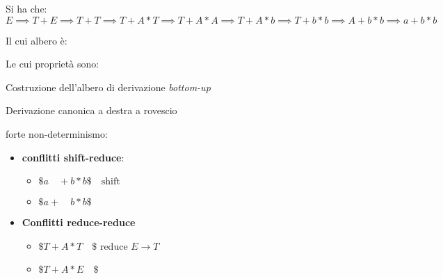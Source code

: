 {    Si ha che:
    \[
        E\implies T+E\implies T+T \implies T + A* T \implies T+A*A \implies T + A * b \implies T + b * b \implies A + b*b  \implies a + b*b
    \]

    Il cui albero è:
    \begin{center}
    \end{center}
    
    Le cui proprietà sono:
    \begin{center}
        \item Costruzione dell'albero di derivazione \textit{bottom-up}    
        \item Derivazione canonica a destra a rovescio
        \item forte non-determinismo:
        \begin{itemize}
            \item \textbf{conflitti shift-reduce}:
            \begin{itemize}
                \item $\$a \quad +b*b\$ \quad \text{shift}$
                \item $\$ a+ \quad b*b \$$
            \end{itemize}
            \item \textbf{Conflitti reduce-reduce}
            \begin{itemize}
                \item $\$T+A*T\quad\$$ reduce $E\to T$
                \item $\$T+A*E\quad\$$
            \end{itemize}
        \end{itemize}
    \end{center}
}

